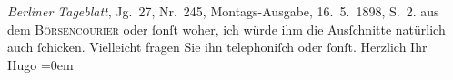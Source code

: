 \begin{ledgroupsized}[t]{13cm}
{{{                        \emph{Berliner Tageblatt}, Jg. 27, Nr. 245,
                     Montags-Ausgabe, 16. 5. 1898, S. 2.}}}\label{K_L00796-3h} aus dem \textsc{Börsencourier} oder ſonſt woher, ich würde ihm die Ausſchnitte natürlich auch ſchicken.
               Vielleicht fragen Sie ihn telephoniſch oder ſonſt.\pend
           \pstart
           Herzlich Ihr{\\[\baselineskip]}\spacefill\mbox{Hugo}\pend
           \leftskip=0em{}
         
         \endnumbering{}\end{ledgroupsized}  \newcommand{\dateiname}{L00796}\newcommand{\titel}{Hugo von Hofmannsthal an Arthur Schnitzler, [18. 5. 1898]}\newcommand{\editorInnen}{Martin Anton Müller und Gerd-Hermann Susen}
      